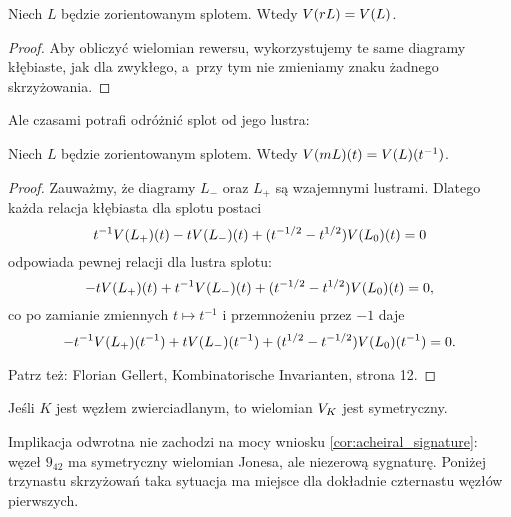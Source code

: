 \begin{proposition}
    Niech $L$ będzie zorientowanym splotem.
    Wtedy $V(rL)=V(L)$.
%
\end{proposition}

\begin{proof}
    Aby obliczyć wielomian rewersu, wykorzystujemy te same diagramy kłębiaste,
    jak dla zwykłego, a~przy tym nie zmieniamy znaku żadnego skrzyżowania.
\end{proof}

Ale czasami potrafi odróżnić splot od jego lustra:

\begin{proposition}
    Niech $L$ będzie zorientowanym splotem.
    Wtedy $V(mL)(t)=V(L)(t^{-1})$.
%
\end{proposition}

\begin{proof}
    Zauważmy, że diagramy $L_-$ oraz $L_+$ są wzajemnymi lustrami.
    Dlatego każda relacja kłębiasta dla splotu postaci
    \begin{equation}
        t^{-1} V(L_+)(t) - tV(L_-)(t) + (t^{-1/2} - t^{1/2}) V(L_0)(t) = 0
    \end{equation}
    odpowiada pewnej relacji dla lustra splotu:
    \begin{equation}
        -tV(L_+)(t) + t^{-1} V(L_-)(t) + (t^{-1/2} - t^{1/2}) V(L_0)(t) = 0,
    \end{equation}
    co po zamianie zmiennych $t \mapsto t^{-1}$ i przemnożeniu przez $-1$ daje
    \begin{equation}
        -t^{-1} V(L_+)(t^{-1}) + t V(L_-)(t^{-1}) + (t^{1/2} - t^{-1/2}) V(L_0)(t^{-1}) = 0.
    \end{equation}

    Patrz też: Florian Gellert, Kombinatorische Invarianten, strona 12.
\end{proof}

\begin{corollary}
    \label{cor:joines_of_amphicheiral}
    Jeśli $K$ jest węzłem zwierciadlanym, to wielomian $V_K$ jest symetryczny.
\end{corollary}

Implikacja odwrotna nie zachodzi na mocy wniosku \ref{cor:acheiral_signature}: węzeł $9_{42}$ ma symetryczny wielomian Jonesa, ale niezerową sygnaturę.
%
Poniżej trzynastu skrzyżowań taka sytuacja ma miejsce dla dokładnie czternastu węzłów pierwszych.

